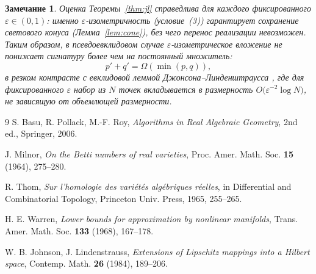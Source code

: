 \documentclass[12pt]{article}
\newtheorem{remark}{Замечание}
\begin{document}
\begin{remark}
Оценка Теоремы~\ref{thm:jl} справедлива для \emph{каждого} фиксированного \(\varepsilon\in(0,1)\): именно \(\varepsilon\)-изометричность (условие~(3)) гарантирует сохранение светового конуса (Лемма~\ref{lem:cone}), без чего перенос реализации невозможен. Таким образом, в псевдоевклидовом случае \(\varepsilon\)-изометрическое вложение не понижает сигнатуру более чем на постоянный множитель:
\[
p'+q' = \Omega(\min(p,q)),
\]
в резком контрасте с евклидовой леммой Джонсона--Линденштраусса \cite{JL1984}, где для фиксированного \(\varepsilon\) набор из \(N\) точек вкладывается в размерность \(O\!\bigl(\varepsilon^{-2}\log N\bigr)\), не зависящую от объемлющей размерности.
\end{remark}

\begin{thebibliography}{9}
S. Basu, R. Pollack, M.-F. Roy, \emph{Algorithms in Real Algebraic Geometry}, 2nd ed., Springer, 2006.

J. Milnor, \emph{On the Betti numbers of real varieties}, Proc. Amer. Math. Soc. \textbf{15} (1964), 275--280.

R. Thom, \emph{Sur l'homologie des vari\'et\'es alg\'ebriques r\'eelles}, in Differential and Combinatorial Topology, Princeton Univ. Press, 1965, 255--265.

H. E. Warren, \emph{Lower bounds for approximation by nonlinear manifolds}, Trans. Amer. Math. Soc. \textbf{133} (1968), 167--178.

W. B. Johnson, J. Lindenstrauss, \emph{Extensions of Lipschitz mappings into a Hilbert space}, Contemp. Math. \textbf{26} (1984), 189--206.
\end{thebibliography}
\end{document}
